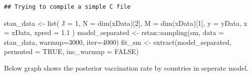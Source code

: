 \documentclass[
]{article}
\newenvironment{Shaded}{\begin{snugshade}}{\end{snugshade}}
\newcommand{\AttributeTok}[1]{\textcolor[rgb]{0.77,0.63,0.00}{#1}}
\newcommand{\ConstantTok}[1]{\textcolor[rgb]{0.00,0.00,0.00}{#1}}
\newcommand{\DecValTok}[1]{\textcolor[rgb]{0.00,0.00,0.81}{#1}}
\newcommand{\FloatTok}[1]{\textcolor[rgb]{0.00,0.00,0.81}{#1}}
\newcommand{\FunctionTok}[1]{\textcolor[rgb]{0.00,0.00,0.00}{#1}}
\newcommand{\NormalTok}[1]{#1}
\newcommand{\OtherTok}[1]{\textcolor[rgb]{0.56,0.35,0.01}{#1}}
\newcommand{\SpecialCharTok}[1]{\textcolor[rgb]{0.00,0.00,0.00}{#1}}
\newcommand{\StringTok}[1]{\textcolor[rgb]{0.31,0.60,0.02}{#1}}
\begin{document}
\begin{verbatim}
## Trying to compile a simple C file
\end{verbatim}

\begin{Shaded}
\begin{Highlighting}[]
\NormalTok{stan\_data }\OtherTok{\textless{}{-}} \FunctionTok{list}\NormalTok{(}
    \AttributeTok{J =} \DecValTok{1}\NormalTok{,}
    \AttributeTok{N =} \FunctionTok{dim}\NormalTok{(xData)[}\DecValTok{2}\NormalTok{],}
    \AttributeTok{M =} \FunctionTok{dim}\NormalTok{(xData)[}\DecValTok{1}\NormalTok{],}
    \AttributeTok{y =}\NormalTok{ yData,}
    \AttributeTok{x =}\NormalTok{ xData,}
    \AttributeTok{xpred =} \FloatTok{1.1}
\NormalTok{)}
\NormalTok{model\_separated }\OtherTok{\textless{}{-}}\NormalTok{ rstan}\SpecialCharTok{::}\FunctionTok{sampling}\NormalTok{(sm, }\AttributeTok{data =}\NormalTok{ stan\_data, }\AttributeTok{warmup=}\DecValTok{3000}\NormalTok{, }\AttributeTok{iter=}\DecValTok{4000}\NormalTok{)}
\NormalTok{fit\_sm }\OtherTok{\textless{}{-}} \FunctionTok{extract}\NormalTok{(model\_separated, }\AttributeTok{permuted =} \ConstantTok{TRUE}\NormalTok{, }\AttributeTok{inc\_warmup =} \ConstantTok{FALSE}\NormalTok{)}
\end{Highlighting}
\end{Shaded}

Below graph shows the posterior vaccination rate by countries in
seperate model.

\begin{Shaded}
\end{Shaded}
\end{document}
